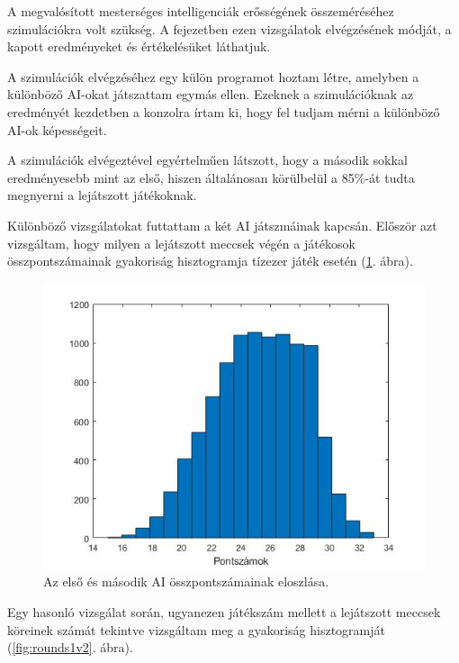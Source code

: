 
A megvalósított mesterséges intelligenciák erősségének összeméréséhez szimulációkra volt szükség. A fejezetben ezen vizsgálatok elvégzésének módját, a kapott eredményeket és értékelésüket láthatjuk.


A szimulációk elvégzéséhez egy külön programot hoztam létre, amelyben a különböző AI-okat játszattam egymás ellen. Ezeknek a szimulációknak az eredményét kezdetben a konzolra írtam ki, hogy fel tudjam mérni a különböző AI-ok képességeit.


A szimulációk elvégeztével egyértelműen látszott, hogy a második sokkal eredményesebb mint az első, hiszen általánosan körülbelül a 85\%-át tudta megnyerni a lejátszott játékoknak.

Különböző vizsgálatokat futtattam a két AI játszmáinak kapcsán. Először azt vizsgáltam, hogy milyen a lejátszott meccsek végén a játékosok összpontszámainak gyakoriság hisztogramja tízezer játék esetén (\ref{fig:scores1v2}. ábra).

\begin{figure}[h]
\centering
\includegraphics[scale=0.6]{images/final_scores_AI1vsAI2.jpg}
\caption{Az első és második AI összpontszámainak eloszlása.}
\label{fig:scores1v2}
\end{figure}

\newpage
Egy hasonló vizsgálat során, ugyanezen játékszám mellett a lejátszott meccsek köreinek számát tekintve vizsgáltam meg a gyakoriság hisztogramját (\ref{fig:rounds1v2}. ábra).

